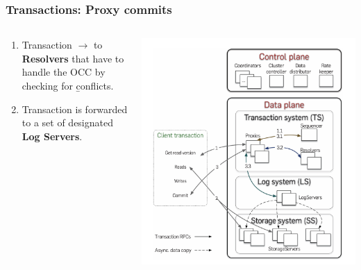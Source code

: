 \begin{frame}
    \frametitle{Transactions: Proxy commits}
    \begin{columns}
        \begin{column}{0.5\textwidth}
            \begin{enumerate}
\item Transaction $\rightarrow$ to \textbf{Resolvers} that have to handle the OCC by checking for \b conflicts.
    \item Transaction is forwarded to a set of designated \textbf{Log Servers}.
            \end{enumerate}
        \end{column}
        \begin{column}{0.5\textwidth}
            \centering
            \includegraphics[width=\textwidth]{img/2-Architecture/Architecture and transaction processing.png}
        \end{column}
    \end{columns}
\end{frame}
